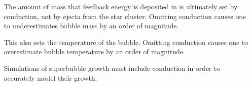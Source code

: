 \documentclass[extrafontsizes, 30pt]{memoir}
\begin{document}
The amount of mass that feedback energy is deposited in is ultimately
	set by conduction, not by ejecta from the star cluster.  Omitting
	conduction causes one to underestimates bubble mass by an order of magnitude.

This also sets the temperature of the bubble.  Omitting conduction
	causes one to overestimate bubble temperature by an order of magnitude.

Simulations of superbubble growth must include conduction in order to
	accurately model their growth.
\end{document}
